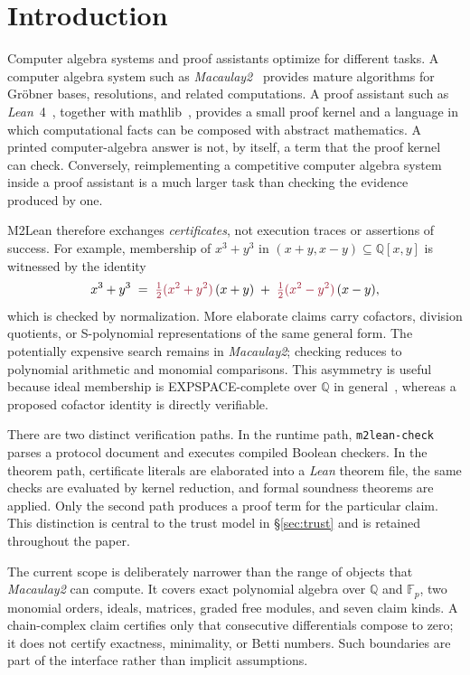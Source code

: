 \documentclass[11pt]{article}
\newcommand{\M}{\textit{Macaulay2}}
\newcommand{\lean}{\textit{Lean}}
\newcommand{\mathlib}{\textsf{mathlib}}
\newcommand{\QQ}{\mathbb{Q}}
\newcommand{\code}[1]{\texttt{#1}}
\begin{document}
\section{Introduction}\label{sec:intro}

Computer algebra systems and proof assistants optimize for different
tasks.  A computer algebra system such as \M{}~\cite{M2} provides
mature algorithms for Gr\"obner bases, resolutions, and related
computations.  A proof assistant such as \lean{}~4~\cite{lean4},
together with \mathlib{}~\cite{mathlib}, provides a small proof kernel
and a language in which computational facts can be composed with
abstract mathematics.  A printed computer-algebra answer is not, by
itself, a term that the proof kernel can check.  Conversely,
reimplementing a competitive computer algebra system inside a proof
assistant is a much larger task than checking the evidence produced by
one.

M2Lean therefore exchanges \emph{certificates}, not execution traces
or assertions of success.  For example, membership of $x^3+y^3$ in
$(x+y,x-y)\subseteq\QQ[x,y]$ is witnessed by the identity
\[
  x^3+y^3 \;=\; \textcolor{m2col}{\tfrac12(x^2+y^2)}\,(x+y)
             \;+\; \textcolor{m2col}{\tfrac12(x^2-y^2)}\,(x-y),
\]
which is checked by normalization.  More elaborate claims carry
cofactors, division quotients, or S-polynomial representations of the
same general form.  The potentially expensive search remains in
\M{}; checking reduces to polynomial arithmetic and monomial
comparisons.  This asymmetry is useful because ideal membership is
EXPSPACE-complete over $\QQ$ in general~\cite{mayr1989}, whereas a proposed
cofactor identity is directly verifiable.

There are two distinct verification paths.  In the runtime path,
\code{m2lean-check} parses a protocol document and executes compiled
Boolean checkers.  In the theorem path, certificate literals are
elaborated into a \lean{} theorem file, the same checks are evaluated
by kernel reduction, and formal soundness theorems are applied.  Only
the second path produces a proof term for the particular claim.  This
distinction is central to the trust model in \S\ref{sec:trust} and is
retained throughout the paper.

The current scope is deliberately narrower than the range of objects
that \M{} can compute.  It covers exact polynomial algebra over
$\QQ$ and $\mathbb F_p$, two monomial orders, ideals, matrices, graded
free modules, and seven claim kinds.  A chain-complex claim certifies
only that consecutive differentials compose to zero; it does not
certify exactness, minimality, or Betti numbers.  Such boundaries are
part of the interface rather than implicit assumptions.
\end{document}
